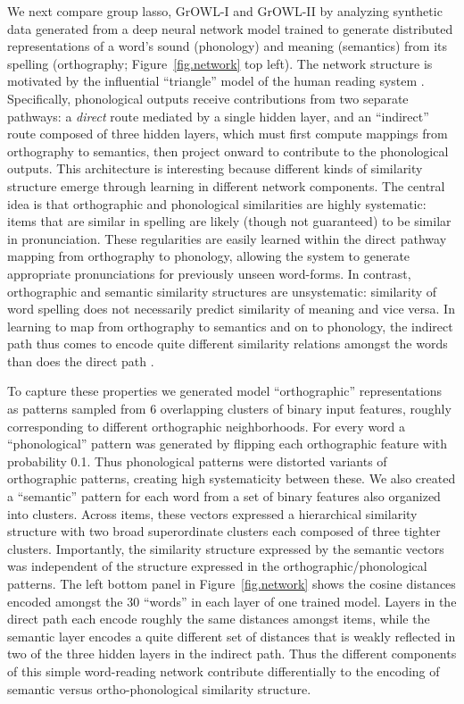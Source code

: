We next compare group lasso, GrOWL-I and GrOWL-II by analyzing synthetic data
generated from a deep neural network model trained to generate distributed
representations of a word's sound (phonology) and meaning (semantics) from its
spelling (orthography; Figure~\ref{fig.network} top left). The network structure
is motivated by the influential ``triangle'' model of the human reading system
\citep{PlautETAL96}. Specifically, phonological outputs receive contributions
from two separate pathways: a {\em direct} route mediated by a single hidden
layer, and an ``indirect'' route composed of three hidden layers, which must
first compute mappings from orthography to semantics, then project onward to
contribute to the phonological outputs. This architecture is interesting because
different kinds of similarity structure emerge through learning in different
network components. The central idea is that orthographic and phonological
similarities are highly systematic: items that are similar in spelling are
likely (though not guaranteed) to be similar in pronunciation. These
regularities are easily learned within the direct pathway mapping from
orthography to phonology, allowing the system to generate appropriate
pronunciations for previously unseen word-forms. In contrast, orthographic and
semantic similarity structures are unsystematic: similarity of word spelling
does not necessarily predict similarity of meaning and vice versa. In learning
to map from orthography to semantics and on to phonology, the indirect path thus
comes to encode quite different similarity relations amongst the words than does
the direct path \citep{PlautETAL96,HarmSeidenberg04}.

To capture these properties we generated model ``orthographic'' representations
as patterns sampled from 6 overlapping clusters of binary input features,
roughly corresponding to different orthographic neighborhoods. For every word a
``phonological'' pattern was generated by flipping each orthographic feature
with probability 0.1. Thus phonological patterns were distorted variants of
orthographic patterns, creating high systematicity between these. We also
created a ``semantic'' pattern for each word from a set of binary features also
organized into clusters. Across items, these vectors expressed a hierarchical
similarity structure with two broad superordinate clusters each composed of
three tighter clusters. Importantly, the similarity structure expressed by the
semantic vectors was independent of the structure expressed in the
orthographic/phonological patterns. The left bottom panel in
Figure~\ref{fig.network} shows the cosine distances encoded amongst the 30
``words'' in each layer of one trained model. Layers in the direct path each
encode roughly the same distances amongst items, while the semantic layer
encodes a quite different set of distances that is weakly reflected in two of
the three hidden layers in the indirect path.  Thus the different components of
this simple word-reading network contribute differentially to the encoding of
semantic versus ortho-phonological similarity structure.

